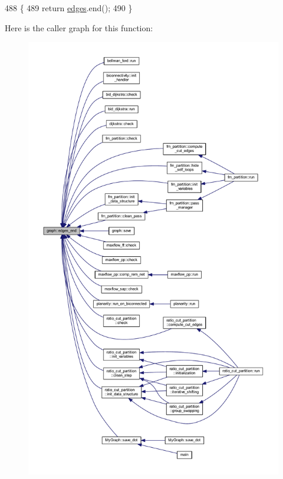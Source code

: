 \begin{DoxyCode}
488 \{
489     \textcolor{keywordflow}{return} \mbox{\hyperlink{classgraph_ab5b1c610cca1bcf72b05aacc28a48153}{edges}}.end();
490 \}
\end{DoxyCode}
Here is the caller graph for this function\+:
\nopagebreak
\begin{figure}[H]
\begin{center}
\leavevmode
\includegraphics[height=550pt]{classgraph_aea8d7f976b85b6137f52d915e26639f6_icgraph}
\end{center}
\end{figure}
\mbox{\label{class_my_graph_ae6bb4074fb50ab3f3bd811e64621b9fc}} 
